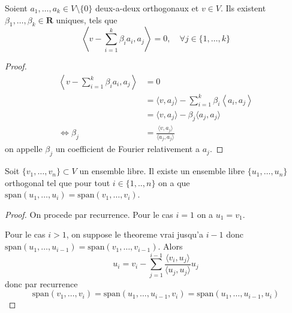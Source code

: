 \begin{theorem}
Soient $a_{1},\dots,a_{k}\in V\setminus \{ 0 \}$ deux-a-deux orthogonaux et $v\in V$. Ils existent $\beta_{1},\dots,\beta _{k}\in \mathbf{R}$ uniques, tels que 
$$
\left\langle  v-\sum_{i=1}^{k}\beta _{i}a_{i},a_{j}   \right\rangle=0,\quad \forall j\in \{ 1,\dots,k \} 
$$
\end{theorem}
\begin{proof}
\begin{align*}
\left\langle  v-\sum_{i=1}^{k}\beta _{i}a_{i},a_{j}   \right\rangle & =0 \\
 & =\langle v,a_{j} \rangle -\sum _{i=1}^{k}\beta _{i}\left\langle  a_{i} ,a_{j} \right\rangle \\
 & =\langle v,a_{j} \rangle -\beta _{j}\langle a_{j},a_{j} \rangle  \\
\Leftrightarrow \beta _{j} & = \frac{\langle v,a_{j} \rangle }{\langle a_{j},a_{j} \rangle }
\end{align*}
on appelle $\beta _{j}$ un coefficient de Fourier relativement a $a_{j}$.
\end{proof}
\begin{theorem}
Soit $\{ v_{1},\dots,v_{n} \}\subset V$ un ensemble libre. Il existe un ensemble libre $\{ u_{1},\dots,u_{n} \}$ orthogonal tel que pour tout $i\in \{ 1,..,n \}$ on a que $\mathrm{span}(u_{1},\dots,u_{i})=\mathrm{span}(v_{1},\dots,v_{i})$. 
\end{theorem}
\begin{proof}
On procede par recurrence. Pour le cas $i=1$ on a $u_{1}=v_{1}$.

Pour le cas $i>1$, on suppose le theoreme vrai jusqu'a $i-1$ donc $\mathrm{span}(u_{1},\dots,u_{i-1})=\mathrm{span}(v_{1},\dots,v_{i-1})$. Alors
$$
u_{i}=v_{i}-\sum_{j=1}^{i-1} \frac{\langle v_{i},u_{j} \rangle }{\langle u_{j},u_{j} \rangle }u_{j} 
$$
donc par recurrence
$$
\mathrm{span}(v_{1},\dots,v_{i})=\mathrm{span}(u_{1},\dots,u_{i-1},v_{i})=\mathrm{span}(u_{1},\dots,u_{i-1},u_{i})
$$
\end{proof}


